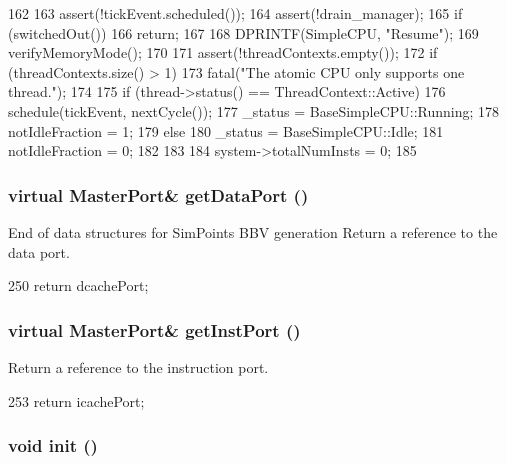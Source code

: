 \begin{DoxyCode}
162 {
163     assert(!tickEvent.scheduled());
164     assert(!drain_manager);
165     if (switchedOut())
166         return;
167 
168     DPRINTF(SimpleCPU, "Resume\n");
169     verifyMemoryMode();
170 
171     assert(!threadContexts.empty());
172     if (threadContexts.size() > 1)
173         fatal("The atomic CPU only supports one thread.\n");
174 
175     if (thread->status() == ThreadContext::Active) {
176         schedule(tickEvent, nextCycle());
177         _status = BaseSimpleCPU::Running;
178         notIdleFraction = 1;
179     } else {
180         _status = BaseSimpleCPU::Idle;
181         notIdleFraction = 0;
182     }
183 
184     system->totalNumInsts = 0;
185 }
\end{DoxyCode}
\hypertarget{classAtomicSimpleCPU_aeea6b55ae1c4be53c21dbee434b221d4}{
\subsubsection[{getDataPort}]{\setlength{\rightskip}{0pt plus 5cm}virtual {\bf MasterPort}\& getDataPort ()}}
\label{classAtomicSimpleCPU_aeea6b55ae1c4be53c21dbee434b221d4}
End of data structures for SimPoints BBV generation Return a reference to the data port. 


\begin{DoxyCode}
250 { return dcachePort; }
\end{DoxyCode}
\hypertarget{classAtomicSimpleCPU_a40da530cb5dd380fd7fc0d786e94d5eb}{
\subsubsection[{getInstPort}]{\setlength{\rightskip}{0pt plus 5cm}virtual {\bf MasterPort}\& getInstPort ()}}
\label{classAtomicSimpleCPU_a40da530cb5dd380fd7fc0d786e94d5eb}
Return a reference to the instruction port. 


\begin{DoxyCode}
253 { return icachePort; }
\end{DoxyCode}
\hypertarget{classAtomicSimpleCPU_a02fd73d861ef2e4aabb38c0c9ff82947}{
\subsubsection[{init}]{\setlength{\rightskip}{0pt plus 5cm}void init ()}}
\label{classAtomicSimpleCPU_a02fd73d861ef2e4aabb38c0c9ff82947}



